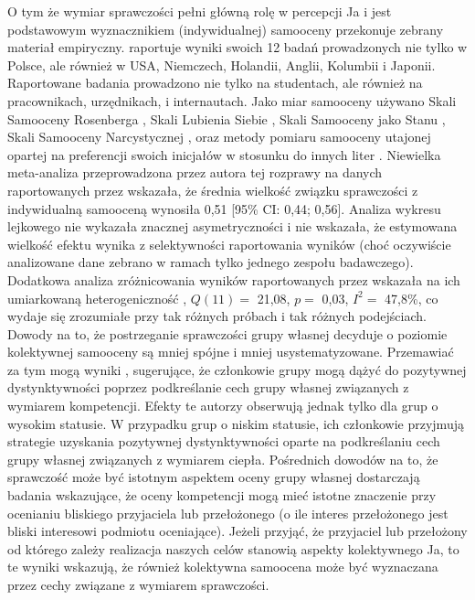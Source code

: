\documentclass[man]{apa6}
\begin{document}
O tym że wymiar sprawczości pełni główną rolę w percepcji Ja i jest podstawowym wyznacznikiem (indywidualnej) samooceny przekonuje zebrany materiał empiryczny. \textcite{wojciszke2010sprawczosc} raportuje wyniki swoich 12 badań prowadzonych nie tylko w Polsce, ale również w USA, Niemczech, Holandii, Anglii, Kolumbii i Japonii. Raportowane badania prowadzono nie tylko na studentach, ale również na pracownikach, urzędnikach, i internautach. Jako miar samooceny używano Skali Samooceny Rosenberga \parencite{rosenberg1965society}, Skali Lubienia Siebie \parencite{tafarodi2001two}, Skali Samooceny jako Stanu \parencite{heatherton1991development}, Skali Samooceny Narcystycznej \parencite{raskin1979narcissistic}, oraz metody pomiaru samooceny utajonej opartej na preferencji swoich inicjałów w stosunku do innych liter \parencite{koole20030nature}. Niewielka meta-analiza przeprowadzona przez autora tej rozprawy na danych raportowanych przez \textcite{wojciszke2010sprawczosc} wskazała, że średnia wielkość związku sprawczości z indywidualną samooceną wynosiła 0,51 [95\% CI: 0,44; 0,56]. Analiza wykresu lejkowego nie wykazała znacznej asymetryczności i nie wskazała, że estymowana wielkość efektu wynika z selektywności raportowania wyników (choć oczywiście analizowane dane zebrano w ramach tylko jednego zespołu badawczego). Dodatkowa analiza zróżnicowania wyników raportowanych przez \textcite{wojciszke2010sprawczosc} wskazała na ich umiarkowaną heterogeniczność \parencite[patrz,][]{higgins2003measuring}, $Q(11) = $ 21,08, $p = $ 0,03, $I^2 = $ 47,8\%, co wydaje się zrozumiałe przy tak różnych próbach i tak różnych podejściach.\\

Dowody na to, że postrzeganie sprawczości grupy własnej decyduje o poziomie kolektywnej samooceny są mniej spójne i mniej usystematyzowane. Przemawiać za tym mogą wyniki \textcite{oldmeadow2010social}, sugerujące, że członkowie grupy mogą dążyć do pozytywnej dystynktywności poprzez podkreślanie cech grupy własnej związanych z wymiarem kompetencji. Efekty te autorzy obserwują jednak tylko dla grup o wysokim statusie. W przypadku grup o niskim statusie, ich członkowie przyjmują strategie uzyskania pozytywnej dystynktywności oparte na podkreślaniu cech grupy własnej związanych z wymiarem ciepła. Pośrednich dowodów na to, że sprawczość może być istotnym aspektem oceny grupy własnej dostarczają badania \textcite{wojciszke2008primacy} wskazujące, że oceny kompetencji mogą mieć istotne znaczenie przy ocenianiu bliskiego przyjaciela lub przełożonego (o ile interes przełożonego jest bliski interesowi podmiotu oceniające). Jeżeli przyjąć, że przyjaciel lub przełożony od którego zależy realizacja naszych celów stanowią aspekty kolektywnego Ja, to te wyniki wskazują, że również kolektywna samoocena może być wyznaczana przez cechy związane z wymiarem sprawczości.
\end{document}
